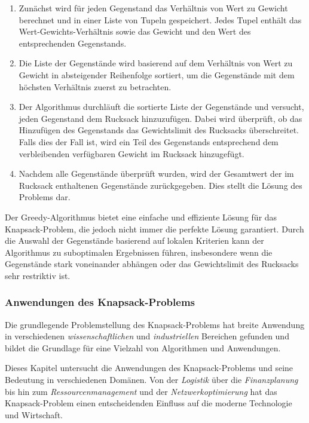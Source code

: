 \begin{enumerate}
\item Zunächst wird für jeden Gegenstand das Verhältnis von Wert zu Gewicht berechnet und in einer Liste von Tupeln
gespeichert. Jedes Tupel enthält das Wert-Gewichts-Verhältnis sowie das Gewicht und den Wert des entsprechenden Gegenstands.
\item Die Liste der Gegenstände wird basierend auf dem Verhältnis von Wert zu Gewicht in absteigender Reihenfolge
sortiert, um die Gegenstände mit dem höchsten Verhältnis zuerst zu betrachten.
\item Der Algorithmus durchläuft die sortierte Liste der Gegenstände und versucht, jeden Gegenstand dem Rucksack
hinzuzufügen. Dabei wird überprüft, ob das Hinzufügen des Gegenstands das Gewichtslimit des Rucksacks überschreitet.
Falls dies der Fall ist, wird ein Teil des Gegenstands entsprechend dem verbleibenden verfügbaren Gewicht im Rucksack hinzugefügt.
\item Nachdem alle Gegenstände überprüft wurden, wird der Gesamtwert der im Rucksack enthaltenen Gegenstände zurückgegeben.
Dies stellt die Lösung des Problems dar.
\end{enumerate}

Der Greedy-Algorithmus bietet eine einfache und effiziente Lösung für das Knapsack-Problem, die jedoch nicht immer die
perfekte Lösung garantiert. Durch die Auswahl der Gegenstände basierend auf lokalen Kriterien kann der Algorithmus zu
suboptimalen Ergebnissen führen, insbesondere wenn die Gegenstände stark voneinander abhängen oder das Gewichtslimit des
Rucksacks sehr restriktiv ist.

\subsubsection{Anwendungen des Knapsack-Problems}
Die grundlegende Problemstellung des Knapsack-Problems hat breite Anwendung in verschiedenen \textit{wissenschaftlichen}
und \textit{industriellen} Bereichen gefunden und bildet die Grundlage für eine Vielzahl von Algorithmen und Anwendungen.

Dieses Kapitel untersucht die Anwendungen des Knapsack-Problems und seine Bedeutung in verschiedenen Domänen. Von der
\textit{Logistik} über die \textit{Finanzplanung} bis hin zum \textit{Ressourcenmanagement} und der \textit{Netzwerkoptimierung}
hat das Knapsack-Problem einen entscheidenden Einfluss auf die moderne Technologie und Wirtschaft.

